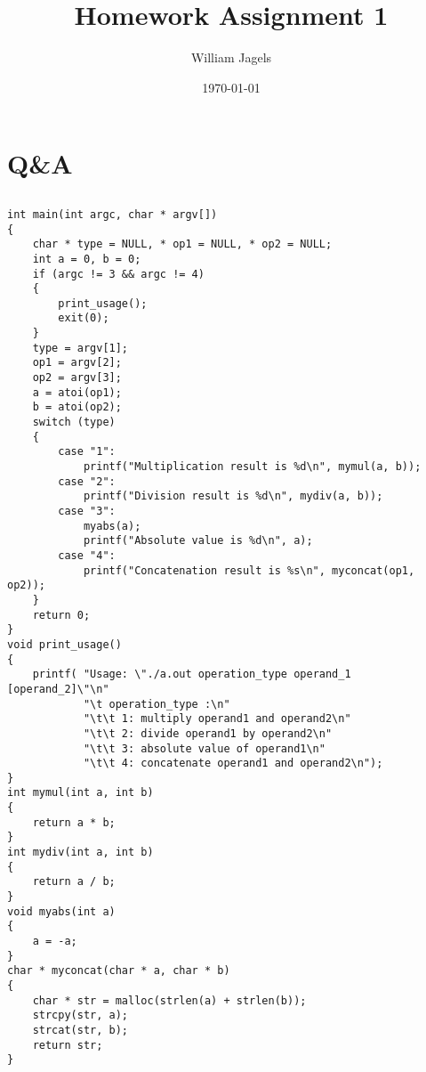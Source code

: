 \documentclass[a4paper,11pt]{article}
\title{Homework Assignment 1}
\author{William Jagels}
\date{\today}
\begin{document}
\maketitle

\section{Q\&A}

\subsection{}
\begin{lstlisting}[caption=badcode.c]
int main(int argc, char * argv[])
{
    char * type = NULL, * op1 = NULL, * op2 = NULL;
    int a = 0, b = 0;
    if (argc != 3 && argc != 4)
    {
        print_usage();
        exit(0);
    }
    type = argv[1];
    op1 = argv[2];
    op2 = argv[3];
    a = atoi(op1);
    b = atoi(op2);
    switch (type)
    {
        case "1":
            printf("Multiplication result is %d\n", mymul(a, b));
        case "2":
            printf("Division result is %d\n", mydiv(a, b));
        case "3":
            myabs(a);
            printf("Absolute value is %d\n", a);
        case "4":
            printf("Concatenation result is %s\n", myconcat(op1, op2));
    }
    return 0;
}
void print_usage()
{
    printf( "Usage: \"./a.out operation_type operand_1 [operand_2]\"\n"
            "\t operation_type :\n"
            "\t\t 1: multiply operand1 and operand2\n"
            "\t\t 2: divide operand1 by operand2\n"
            "\t\t 3: absolute value of operand1\n"
            "\t\t 4: concatenate operand1 and operand2\n");
}
int mymul(int a, int b)
{
    return a * b;
}
int mydiv(int a, int b)
{
    return a / b;
}
void myabs(int a)
{
    a = -a;
}
char * myconcat(char * a, char * b)
{
    char * str = malloc(strlen(a) + strlen(b));
    strcpy(str, a);
    strcat(str, b);
    return str;
}
\end{lstlisting}
\end{document}
